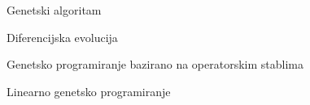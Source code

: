   \begin{frame}{Genetski algoritam}
  \end{frame}

  \begin{frame}{Diferencijska evolucija}
  \end{frame}

  \begin{frame}{Genetsko programiranje bazirano na operatorskim stablima}
  \end{frame}

  \begin{frame}{Linearno genetsko programiranje}
  \end{frame}
